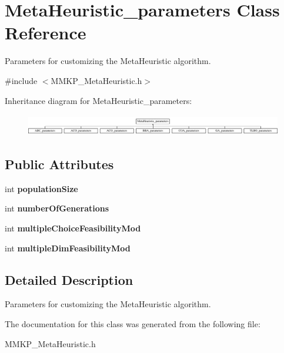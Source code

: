 \hypertarget{class_meta_heuristic__parameters}{\section{Meta\+Heuristic\+\_\+parameters Class Reference}
\label{class_meta_heuristic__parameters}
}


Parameters for customizing the Meta\+Heuristic algorithm.  




{\ttfamily \#include $<$M\+M\+K\+P\+\_\+\+Meta\+Heuristic.\+h$>$}

Inheritance diagram for Meta\+Heuristic\+\_\+parameters\+:\begin{figure}[H]
\begin{center}
\leavevmode
\includegraphics[height=0.952381cm]{class_meta_heuristic__parameters}
\end{center}
\end{figure}
\subsection*{Public Attributes}
\begin{DoxyCompactItemize}
\item 
\hypertarget{class_meta_heuristic__parameters_a24871d991521941727591be8555c9ed4}{int {\bfseries population\+Size}}\label{class_meta_heuristic__parameters_a24871d991521941727591be8555c9ed4}

\item 
\hypertarget{class_meta_heuristic__parameters_ae30f5d20695b5acadc0e7e0d60620f99}{int {\bfseries number\+Of\+Generations}}\label{class_meta_heuristic__parameters_ae30f5d20695b5acadc0e7e0d60620f99}

\item 
\hypertarget{class_meta_heuristic__parameters_aef3eb99f9e53c1c0c81498afedeb1cb8}{int {\bfseries multiple\+Choice\+Feasibility\+Mod}}\label{class_meta_heuristic__parameters_aef3eb99f9e53c1c0c81498afedeb1cb8}

\item 
\hypertarget{class_meta_heuristic__parameters_a6cb00f84dd24d56104016608fbb0d7a7}{int {\bfseries multiple\+Dim\+Feasibility\+Mod}}\label{class_meta_heuristic__parameters_a6cb00f84dd24d56104016608fbb0d7a7}

\end{DoxyCompactItemize}


\subsection{Detailed Description}
Parameters for customizing the Meta\+Heuristic algorithm. 

The documentation for this class was generated from the following file\+:\begin{DoxyCompactItemize}
\item 
M\+M\+K\+P\+\_\+\+Meta\+Heuristic.\+h\end{DoxyCompactItemize}
